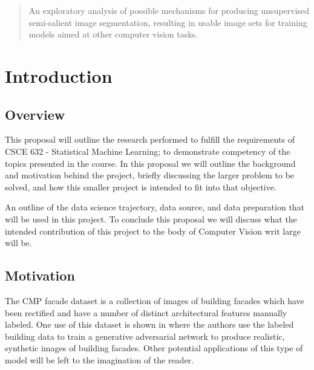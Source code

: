 \documentclass[sigplan,nonacm]{acmart}
\begin{document}
\title{}

\author{Brandon Hosley}

\begin{abstract}
	An exploratory analysis of possible mechanisms for producing
	unsupervised semi-salient image segmentation, resulting in
	usable image sets for training models aimed at other computer vision tasks.
\end{abstract}

\received{\today}
\maketitle

\section{Introduction}
\subsection{Overview}

This proposal will outline the research performed to fulfill the requirements of 
CSCE 632 - Statistical Machine Learning; 
to demonstrate competency of the topics presented in the course.
In this proposal we will outline the background and motivation behind the project,
briefly discussing the larger problem to be solved, and how this smaller project
is intended to fit into that objective.

An outline of the data science trajectory, data source, and data preparation that
will be used in this project.
To conclude this proposal we will discuss what the intended contribution of this project
to the body of Computer Vision writ large will be.


\subsection{Motivation}

The CMP facade dataset \cite{tylecek2013}
is a collection of images of building facades which have been rectified and
have a number of distinct architectural features manually labeled.
One use of this dataset is shown in \cite{isola2018}
where the authors use the labeled building data to train a generative adversarial network
to produce realistic, synthetic images of building facades.
Other potential applications of this type of model will be left to the imagination of the reader.
\end{document}
